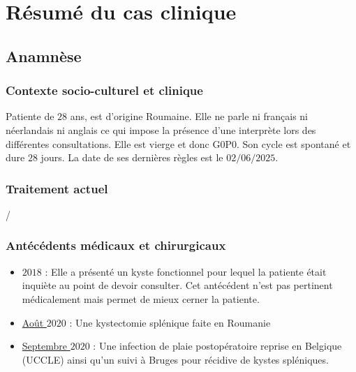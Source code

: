 \section{Résumé du cas clinique}

\subsection{Anamnèse}

\subsubsection{Contexte socio-culturel et clinique}
Patiente de $28$ ans, est d’origine Roumaine. Elle ne parle ni français ni néerlandais ni anglais ce qui impose la présence d’une interprète lors des différentes consultations. Elle est vierge et donc G0P0. Son cycle est spontané et dure $28$ jours. La date de ses dernières règles est le $02/06/2025$.

\subsubsection{Traitement actuel}
/

\subsubsection{Antécédents médicaux et chirurgicaux}
\begin{itemize}[label=\textbullet]
    \item \underline{$2018$} : Elle a présenté un kyste fonctionnel pour lequel la patiente était inquiète au point de devoir consulter. Cet antécédent n’est pas pertinent médicalement mais permet de mieux cerner la patiente.
    
    \item \underline{Août $2020$} : Une kystectomie splénique faite en Roumanie
    
    \item \underline{Septembre $2020$} : Une infection de plaie postopératoire reprise en Belgique (UCCLE) ainsi qu’un suivi à Bruges pour récidive de kystes spléniques.
\end{itemize}

